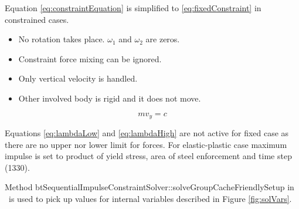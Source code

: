 Equation \ref{eq:constraintEquation} is simplified
to \ref{eq:fixedConstraint} in constrained cases.
\begin{itemize}
\item No rotation takes place. $\omega_1$ and $\omega_2$ are zeros.
\item Constraint force mixing can be ignored.
\item Only vertical velocity is handled.
\item Other involved body is rigid and it does not move.
\end{itemize} 

\begin{equation} \label{eq:fixedConstraint}
m v_y = c 
\end{equation}

Equations \ref{eq:lambdaLow} and \ref{eq:lambdaHigh} are not active for fixed case as
there are no upper nor lower limit for forces.
For elastic-plastic case maximum impulse is set to product of yield stress, 
area of steel enforcement and time step (1330).

Method btSequentialImpulseConstraintSolver::solveGroupCacheFriendlySetup
in \bullet\ is used to pick up values for internal variables described in Figure \ref{fig:solVars}. 

